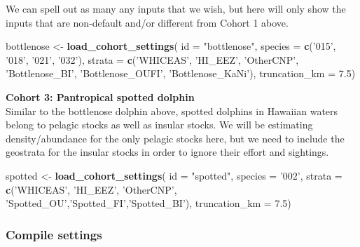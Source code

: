 \documentclass[
]{book}
\newenvironment{Shaded}{\begin{snugshade}}{\end{snugshade}}
\newcommand{\DataTypeTok}[1]{\textcolor[rgb]{0.13,0.29,0.53}{#1}}
\newcommand{\FloatTok}[1]{\textcolor[rgb]{0.00,0.00,0.81}{#1}}
\newcommand{\KeywordTok}[1]{\textcolor[rgb]{0.13,0.29,0.53}{\textbf{#1}}}
\newcommand{\NormalTok}[1]{#1}
\newcommand{\StringTok}[1]{\textcolor[rgb]{0.31,0.60,0.02}{#1}}
\begin{document}
We can spell out as many any inputs that we wish, but here will only show the inputs that are non-default and/or different from Cohort 1 above.

\begin{Shaded}
\begin{Highlighting}[]
\NormalTok{bottlenose <-}\StringTok{ }\KeywordTok{load_cohort_settings}\NormalTok{(}
  \DataTypeTok{id =} \StringTok{"bottlenose"}\NormalTok{,}
  \DataTypeTok{species =} \KeywordTok{c}\NormalTok{(}\StringTok{'015'}\NormalTok{, }\StringTok{'018'}\NormalTok{, }\StringTok{'021'}\NormalTok{, }\StringTok{'032'}\NormalTok{),}
  \DataTypeTok{strata =} \KeywordTok{c}\NormalTok{(}\StringTok{'WHICEAS'}\NormalTok{, }\StringTok{'HI_EEZ'}\NormalTok{, }\StringTok{'OtherCNP'}\NormalTok{,}
             \StringTok{'Bottlenose_BI'}\NormalTok{, }\StringTok{'Bottlenose_OUFI'}\NormalTok{, }\StringTok{'Bottlenose_KaNi'}\NormalTok{),}
  \DataTypeTok{truncation_km =} \FloatTok{7.5}\NormalTok{)}
\end{Highlighting}
\end{Shaded}

\textbf{Cohort 3: Pantropical spotted dolphin}\\
Similar to the bottlenose dolphin above, spotted dolphins in Hawaiian waters belong to pelagic stocks as well as insular stocks. We will be estimating density/abundance for the only pelagic stocks here, but we need to include the geostrata for the insular stocks in order to ignore their effort and sightings.

\begin{Shaded}
\begin{Highlighting}[]
\NormalTok{spotted <-}\StringTok{ }\KeywordTok{load_cohort_settings}\NormalTok{(}
  \DataTypeTok{id =} \StringTok{"spotted"}\NormalTok{,}
  \DataTypeTok{species =} \StringTok{'002'}\NormalTok{,}
  \DataTypeTok{strata =} \KeywordTok{c}\NormalTok{(}\StringTok{'WHICEAS'}\NormalTok{, }\StringTok{'HI_EEZ'}\NormalTok{, }\StringTok{'OtherCNP'}\NormalTok{,}
             \StringTok{'Spotted_OU'}\NormalTok{,}\StringTok{'Spotted_FI'}\NormalTok{,}\StringTok{'Spotted_BI'}\NormalTok{),}
  \DataTypeTok{truncation_km =} \FloatTok{7.5}\NormalTok{)}
\end{Highlighting}
\end{Shaded}

\hypertarget{compile-settings}{%
\subsubsection*{Compile settings}\label{compile-settings}}
\end{document}
